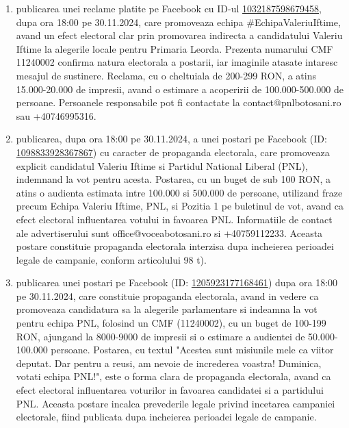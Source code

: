 \documentclass[a4paper,12pt]{article}
\begin{document}
\begin{enumerate}[leftmargin=*, label=\arabic*.)]
    \item publicarea unei reclame platite pe Facebook cu ID-ul \href{https://www.facebook.com/ads/library/?id=1032187598679458}{1032187598679458}, dupa ora 18:00 pe 30.11.2024, care promoveaza echipa \#EchipaValeriuIftime,  avand un efect electoral clar prin promovarea indirecta a candidatului Valeriu Iftime la alegerile locale pentru Primaria Leorda.  Prezenta numarului CMF 11240002 confirma natura electorala a postarii, iar imaginile atasate intaresc mesajul de sustinere.  Reclama, cu o cheltuiala de 200-299 RON, a atins 15.000-20.000 de impresii, avand o estimare a acoperirii de 100.000-500.000 de persoane.  Persoanele responsabile pot fi contactate la contact@pnlbotosani.ro sau +40746995316.
    \item publicarea, dupa ora 18:00 pe 30.11.2024, a unei postari pe Facebook (ID: \href{https://www.facebook.com/ads/library/?id=1098833928367867}{1098833928367867}) cu caracter de propaganda electorala, care promoveaza explicit candidatul Valeriu Iftime si Partidul National Liberal (PNL), indemnand la vot pentru acesta. Postarea, cu un buget de sub 100 RON, a atins o audienta estimata intre 100.000 si 500.000 de persoane, utilizand fraze precum Echipa Valeriu Iftime, PNL, si Pozitia 1 pe buletinul de vot, avand ca efect electoral influentarea votului in favoarea PNL.  Informatiile de contact ale advertiserului sunt office@voceabotosani.ro si +40759112233.  Aceasta postare constituie propaganda electorala interzisa dupa incheierea perioadei legale de campanie, conform articolului 98 t).
    \item publicarea unei postari pe Facebook (ID: \href{https://www.facebook.com/ads/library/?id=1205923177168461}{1205923177168461}) dupa ora 18:00 pe 30.11.2024, care constituie propaganda electorala, avand in vedere ca promoveaza candidatura sa la alegerile parlamentare si indeamna la vot pentru echipa PNL, folosind un CMF (11240002),  cu un buget de 100-199 RON,  ajungand la 8000-9000 de impresii si o estimare a audientei de 50.000-100.000 persoane. Postarea, cu textul "Acestea sunt misiunile mele ca viitor deputat. Dar pentru a reusi, am nevoie de increderea voastra! Duminica, votati echipa PNL!",  este o forma clara de propaganda electorala, avand ca efect electoral influentarea voturilor in favoarea candidatei si a partidului PNL.  Aceasta postare incalca prevederile legale privind incetarea campaniei electorale, fiind publicata dupa incheierea perioadei legale de campanie.

\end{enumerate}
\end{document}
